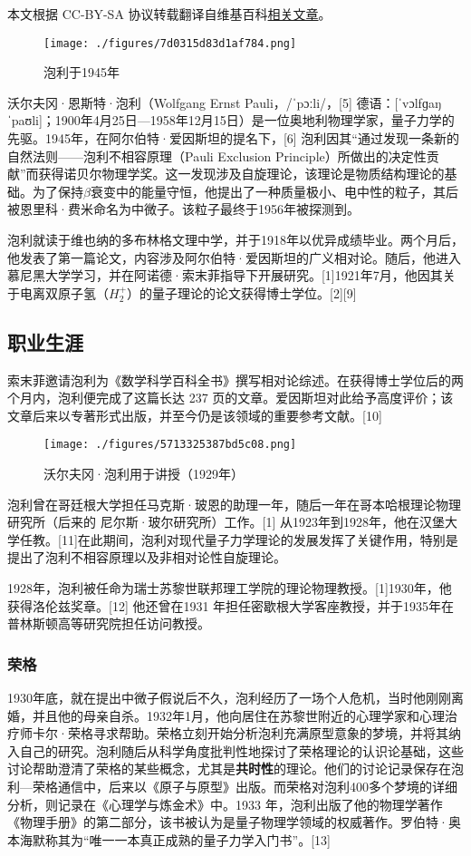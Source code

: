 
本文根据 CC-BY-SA 协议转载翻译自维基百科\href{https://en.wikipedia.org/wiki/Wolfgang_Pauli}{相关文章}。

\begin{figure}[ht]
\centering
\texttt{[image: ./figures/7d0315d83d1af784.png]}
\caption{泡利于1945年} \label{fig_Pauli2_1}
\end{figure}
沃尔夫冈·恩斯特·泡利（Wolfgang Ernst Pauli，/ˈpɔːli/，[5] 德语：[ˈvɔlfɡaŋ ˈpaʊli]；1900年4月25日—1958年12月15日）是一位奥地利物理学家，量子力学的先驱。1945年，在阿尔伯特·爱因斯坦的提名下，[6] 泡利因其“通过发现一条新的自然法则——泡利不相容原理（Pauli Exclusion Principle）所做出的决定性贡献”而获得诺贝尔物理学奖。这一发现涉及自旋理论，该理论是物质结构理论的基础。为了保持\(\beta\)衰变中的能量守恒，他提出了一种质量极小、电中性的粒子，其后被恩里科·费米命名为中微子。该粒子最终于1956年被探测到。

泡利就读于维也纳的多布林格文理中学，并于1918年以优异成绩毕业。两个月后，他发表了第一篇论文，内容涉及阿尔伯特·爱因斯坦的广义相对论。随后，他进入慕尼黑大学学习，并在阿诺德·索末菲指导下开展研究。[1]1921年7月，他因其关于电离双原子氢（\(H_2^+\)）的量子理论的论文获得博士学位。[2][9]
\subsection{职业生涯}  
索末菲邀请泡利为《数学科学百科全书》撰写相对论综述。在获得博士学位后的两个月内，泡利便完成了这篇长达 237 页的文章。爱因斯坦对此给予高度评价；该文章后来以专著形式出版，并至今仍是该领域的重要参考文献。[10]
\begin{figure}[ht]
\centering
\texttt{[image: ./figures/5713325387bd5c08.png]}
\caption{沃尔夫冈·泡利用于讲授（1929年）} \label{fig_Pauli2_2}
\end{figure}
泡利曾在哥廷根大学担任马克斯·玻恩的助理一年，随后一年在哥本哈根理论物理研究所（后来的 尼尔斯·玻尔研究所）工作。[1] 从1923年到1928年，他在汉堡大学任教。[11]在此期间，泡利对现代量子力学理论的发展发挥了关键作用，特别是提出了泡利不相容原理以及非相对论性自旋理论。

1928年，泡利被任命为瑞士苏黎世联邦理工学院的理论物理教授。[1]1930年，他获得洛伦兹奖章。[12] 他还曾在1931 年担任密歇根大学客座教授，并于1935年在普林斯顿高等研究院担任访问教授。
\subsubsection{荣格}  
1930年底，就在提出中微子假说后不久，泡利经历了一场个人危机，当时他刚刚离婚，并且他的母亲自杀。1932年1月，他向居住在苏黎世附近的心理学家和心理治疗师卡尔·荣格寻求帮助。荣格立刻开始分析泡利充满原型意象的梦境，并将其纳入自己的研究。泡利随后从科学角度批判性地探讨了荣格理论的认识论基础，这些讨论帮助澄清了荣格的某些概念，尤其是\textbf{共时性}的理论。他们的讨论记录保存在泡利—荣格通信中，后来以《原子与原型》出版。而荣格对泡利400多个梦境的详细分析，则记录在《心理学与炼金术》中。1933 年，泡利出版了他的物理学著作《物理手册》的第二部分，该书被认为是量子物理学领域的权威著作。罗伯特·奥本海默称其为“唯一一本真正成熟的量子力学入门书”。[13]

